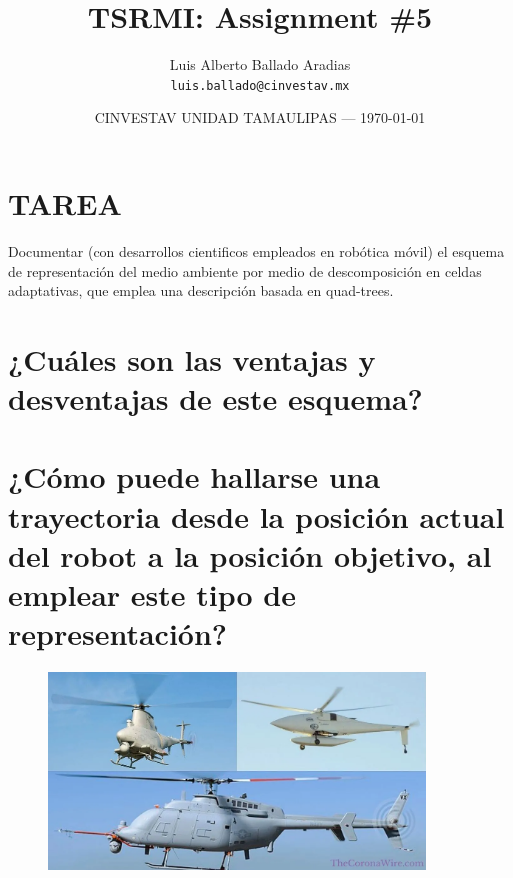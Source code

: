 \documentclass{article}
\title{TSRMI: Assignment \#5} %
\author{Luis Alberto Ballado Aradias\\ \texttt{luis.ballado@cinvestav.mx}} %
\date{CINVESTAV UNIDAD TAMAULIPAS --- \today} %
\begin{document}
\maketitle %


\section*{TAREA} %
Documentar (con desarrollos cientificos empleados en robótica móvil) el esquema de representación del medio ambiente por medio de descomposición en celdas adaptativas, que emplea una descripción basada en quad-trees.

\newpage
\section{¿Cuáles son las ventajas y desventajas de este esquema?}


\newpage
\section{¿Cómo puede hallarse una trayectoria desde la posición actual del robot a la posición objetivo, al emplear este tipo de representación?}


\begin{figure}[h]
  \includegraphics[width=10cm]{images/single_rotor.jpg}
  \centering
\end{figure}
\end{document}
